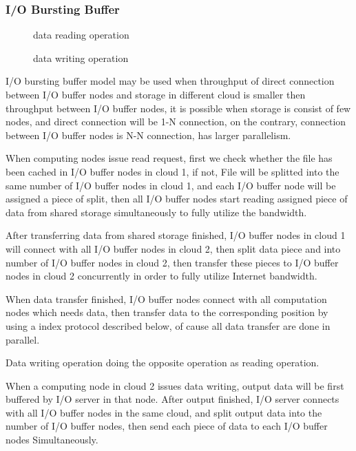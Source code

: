 \documentclass[JIP,draft]{ipsj}
\begin{document}
\subsubsection{I/O Bursting Buffer}

\begin{figure}[tb]
	\centering
	\caption{data reading operation}
	\label{reading}
\end{figure}

\begin{figure}[tb]
	\centering
	\caption{data writing operation}
	\label{writing}
\end{figure}

I/O bursting buffer model may be used when throughput of direct connection between I/O buffer nodes and storage in different cloud is smaller then throughput between I/O buffer nodes, it is possible when storage is consist of few nodes, and direct connection will be 1-N connection, on the contrary, connection between I/O buffer nodes is N-N connection, has larger parallelism.

When computing nodes issue read request, first we check whether the file has been cached in I/O buffer nodes in cloud 1, if not, File will be splitted into the same number of I/O buffer nodes in cloud 1, and each I/O buffer node will be assigned a piece of split, then all I/O buffer nodes start reading assigned piece of data from shared storage simultaneously to fully utilize the bandwidth.%

After transferring data from shared storage finished, I/O buffer nodes in cloud 1 will connect with all I/O buffer nodes in cloud 2, then split data piece and into number of I/O buffer nodes in cloud 2,
then transfer these pieces to I/O buffer nodes in cloud 2 concurrently in order to fully utilize Internet bandwidth.

When data transfer finished, I/O buffer nodes connect with all computation nodes which needs data, then transfer data to the corresponding position by using a index protocol described below, of cause all data transfer are done in parallel.

Data writing operation doing the opposite operation as reading operation.

When a computing node in cloud 2 issues data writing, output data will be first buffered by I/O server in that node.
After output finished, I/O server connects with all I/O buffer nodes in the same cloud, and split output data into the number of I/O buffer nodes, then send each piece of data to each I/O buffer nodes Simultaneously.
\end{document}
